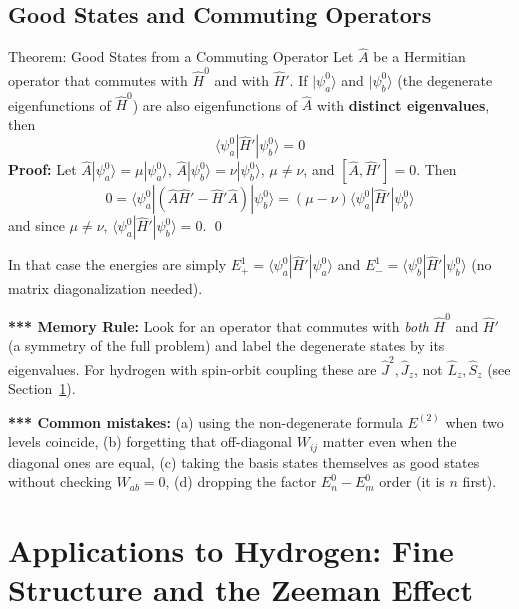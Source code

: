 \documentclass[11pt,a4paper]{article}
\begin{document}
\subsection{Good States and Commuting Operators}
\begin{thm}{Theorem: Good States from a Commuting Operator}
Let $\hat A$ be a Hermitian operator that commutes with $\hat H^0$ and with $\hat H'$. If $|\psi_a^0\rangle$ and $|\psi_b^0\rangle$ (the degenerate eigenfunctions of $\hat H^0$) are also eigenfunctions of $\hat A$ with \textbf{distinct eigenvalues}, then
\[
\langle\psi_a^0|\hat H'|\psi_b^0\rangle = 0
\]
\textbf{Proof:} Let $\hat A|\psi_a^0\rangle = \mu|\psi_a^0\rangle$, $\hat A|\psi_b^0\rangle = \nu|\psi_b^0\rangle$, $\mu\ne\nu$, and $[\hat A,\hat H']=0$. Then
\[
0 = \langle\psi_a^0|(\hat A\hat H' - \hat H'\hat A)|\psi_b^0\rangle = (\mu-\nu)\langle\psi_a^0|\hat H'|\psi_b^0\rangle
\]
and since $\mu\ne\nu$, $\langle\psi_a^0|\hat H'|\psi_b^0\rangle = 0$. \qed
\end{thm}
In that case the energies are simply $E^1_+ = \langle\psi_a^0|\hat H'|\psi_a^0\rangle$ and $E^1_- = \langle\psi_b^0|\hat H'|\psi_b^0\rangle$ (no matrix diagonalization needed).

\textbf{*** Memory Rule:} Look for an operator that commutes with \textit{both} $\hat H^0$ and $\hat H'$ (a symmetry of the full problem) and label the degenerate states by its eigenvalues. For hydrogen with spin-orbit coupling these are $\hat J^2,\hat J_z$, not $\hat L_z,\hat S_z$ (see Section~\ref{ap:sec:hyd}).

\textbf{*** Common mistakes:} (a) using the non-degenerate formula $E^{(2)}$ when two levels coincide, (b) forgetting that off-diagonal $W_{ij}$ matter even when the diagonal ones are equal, (c) taking the basis states themselves as good states without checking $W_{ab}=0$, (d) dropping the factor $E_n^0-E_m^0$ order (it is $n$ first).

\section{Applications to Hydrogen: Fine Structure and the Zeeman Effect}\label{ap:sec:hyd}
\end{document}
